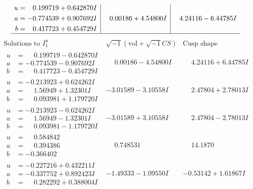 \documentclass[1p]{elsarticle_modified}
\theoremstyle{definition}
\newcommand{\I}{\sqrt{-1}}
\begin{document}
$$\begin{array}{c|c|c}
\begin{aligned}
u &= \phantom{-}0.199719 + 0.642870 I \\
a &= -0.774539 + 0.907692 I \\
b &= \phantom{-}0.417723 + 0.454729 I\end{aligned}
 & \phantom{-}0.00186 + 4.54800 I & \phantom{-}4.24116 - 6.44785 I\\
 \hline 
 \end{array}$$\newpage$$\begin{array}{c|c|c}  
\text{Solutions to }I^u_{1}& \I (\text{vol} + \sqrt{-1}CS) & \text{Cusp shape}\\
 \hline 
\begin{aligned}
u &= \phantom{-}0.199719 - 0.642870 I \\
a &= -0.774539 - 0.907692 I \\
b &= \phantom{-}0.417723 - 0.454729 I\end{aligned}
 & \phantom{-}0.00186 - 4.54800 I & \phantom{-}4.24116 + 6.44785 I \\ \hline\begin{aligned}
u &= -0.213923 + 0.624262 I \\
a &= \phantom{-}1.56949 + 1.32301 I \\
b &= \phantom{-}0.093981 + 1.179720 I\end{aligned}
 & -3.01589 - 3.10558 I & \phantom{-}2.47804 + 2.78013 I \\ \hline\begin{aligned}
u &= -0.213923 - 0.624262 I \\
a &= \phantom{-}1.56949 - 1.32301 I \\
b &= \phantom{-}0.093981 - 1.179720 I\end{aligned}
 & -3.01589 + 3.10558 I & \phantom{-}2.47804 - 2.78013 I \\ \hline\begin{aligned}
u &= \phantom{-}0.584842\phantom{ +0.000000I} \\
a &= \phantom{-}0.394386\phantom{ +0.000000I} \\
b &= -0.366402\phantom{ +0.000000I}\end{aligned}
 & \phantom{-}0.748531\phantom{ +0.000000I} & \phantom{-}14.1870\phantom{ +0.000000I} \\ \hline\begin{aligned}
u &= -0.227216 + 0.432211 I \\
a &= -0.337752 + 0.892423 I \\
b &= \phantom{-}0.282292 + 0.388004 I\end{aligned}
 & -1.49333 - 1.09550 I & -0.53142 + 1.61867 I \\ \hline\begin{aligned}

\end{aligned}
\end{array}$$
\end{document}
